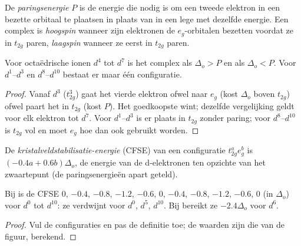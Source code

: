 \begin{definition}[Spintoestanden]\label{def:b2:ligand-field:spin}
De \emph{paringsenergie} $P$ is de energie die nodig is om een tweede
elektron in een bezette orbitaal te plaatsen in plaats van in een lege met dezelfde energie. Een
complex is \emph{hoogspin} wanneer zijn elektronen de $e_g$-orbitalen bezetten
voordat ze in $t_{2g}$ paren, \emph{laagspin} wanneer ze eerst in $t_{2g}$
paren.
\end{definition}

\begin{proposition}\label{prop:b2:ligand-field:spin-state}
Voor octaëdrische ionen $d^4$ tot $d^7$ is het complex  als $\Delta_o > P$ en 
als $\Delta_o < P$. Voor $d^1$--$d^3$ en $d^8$--$d^{10}$ bestaat er maar één configuratie.
\end{proposition}

\begin{proof}
Vanaf $d^3$ ($t_{2g}^3$) gaat het vierde elektron ofwel naar $e_g$ (kost $\Delta_o$ boven
$t_{2g}$) ofwel paart het in $t_{2g}$ (kost $P$). Het goedkoopste wint; dezelfde vergelijking geldt
voor elk elektron tot $d^7$. Voor $d^1$--$d^3$ is er plaats in $t_{2g}$ zonder paring;
voor $d^8$--$d^{10}$ is $t_{2g}$ vol en moet $e_g$ hoe dan ook gebruikt worden.
\end{proof}

\begin{definition}\label{def:b2:ligand-field:cfse}
De \emph{kristalveldstabilisatie-energie}
(CFSE) van een configuratie $t_{2g}^ae_g^b$ is $(-0.4a + 0.6b)\Delta_o$, de energie van
de d-elektronen ten opzichte van het zwaartepunt (de paringsenergieën apart geteld).
\end{definition}

\begin{proposition}\label{prop:b2:ligand-field:cfse}
Bij  is de CFSE $0$, $-0.4$, $-0.8$, $-1.2$, $-0.6$, $0$, $-0.4$, $-0.8$, $-1.2$,
$-0.6$, $0$ (in $\Delta_o$) voor $d^0$ tot $d^{10}$: ze verdwijnt voor $d^0$, $d^5$, $d^{10}$. Bij
 bereikt ze $-2.4\Delta_o$ voor $d^6$.
\end{proposition}

\begin{proof}
Vul de configuraties en pas de definitie toe; de waarden zijn die van de figuur,
berekend.
\end{proof}

